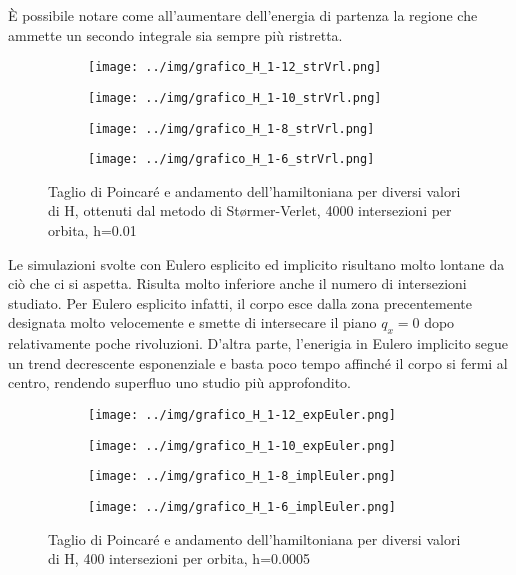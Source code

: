 \documentclass[a4paper]{article}
\numberwithin{equation}{section}
\numberwithin{figure}{section}
\begin{document}
È possibile notare come all'aumentare dell'energia di partenza la regione che ammette un secondo
integrale sia sempre più ristretta.
\clearpage
\begin{figure}[h!]
	\centering
	\begin{subfigure}[t]{.49\textwidth}
		\centering
		\texttt{[image: ../img/grafico\_H\_1-12\_strVrl.png]}
	\end{subfigure}
	\begin{subfigure}[t]{.49\textwidth}
		\centering
		\texttt{[image: ../img/grafico\_H\_1-10\_strVrl.png]}
	\end{subfigure}
	\begin{subfigure}[t]{.49\textwidth}
		\centering
		\texttt{[image: ../img/grafico\_H\_1-8\_strVrl.png]}
	\end{subfigure}
	\begin{subfigure}[t]{.49\textwidth}
		\centering
		\texttt{[image: ../img/grafico\_H\_1-6\_strVrl.png]}
	\end{subfigure}

	\caption{Taglio di Poincaré e andamento dell'hamiltoniana per diversi valori di H,
	ottenuti dal metodo di Størmer-Verlet, 4000 intersezioni per orbita, h=0.01}
	\label{img:stormerverlet}
\end{figure}

Le simulazioni svolte con Eulero esplicito ed implicito risultano molto lontane da ciò che ci
si aspetta. Risulta molto inferiore anche il numero di intersezioni studiato.
Per Eulero esplicito infatti, il corpo esce dalla zona precentemente designata molto velocemente
e smette di intersecare il piano $q_x=0$ dopo relativamente poche rivoluzioni. D'altra parte,
l'enerigia in Eulero implicito segue un trend decrescente esponenziale e basta poco tempo affinché
il corpo si fermi al centro, rendendo superfluo uno studio più approfondito.
\clearpage
\begin{figure}[h!]
	\centering
	\begin{subfigure}[t]{.49\textwidth}
		\centering
		\texttt{[image: ../img/grafico\_H\_1-12\_expEuler.png]}
	\end{subfigure}
	\begin{subfigure}[t]{.49\textwidth}
		\centering
		\texttt{[image: ../img/grafico\_H\_1-10\_expEuler.png]}
	\end{subfigure}
	\begin{subfigure}[t]{.49\textwidth}
		\centering
		\texttt{[image: ../img/grafico\_H\_1-8\_implEuler.png]}
	\end{subfigure}
	\begin{subfigure}[t]{.49\textwidth}
		\centering
		\texttt{[image: ../img/grafico\_H\_1-6\_implEuler.png]}
	\end{subfigure}

	\caption{Taglio di Poincaré e andamento dell'hamiltoniana per diversi valori di H,
	400 intersezioni per orbita, h=0.0005}
\end{figure}
\end{document}
